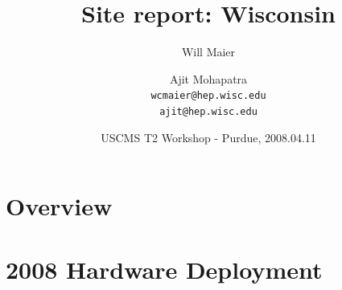 \documentclass{beamer}
\title{Site report: Wisconsin}
\author[Maier, Mohapatra]{
    Will Maier \and Ajit Mohapatra\\ 
    {\tt wcmaier@hep.wisc.edu}\\
    {\tt ajit@hep.wisc.edu}}
\institute[Wisconsin]{University of Wisconsin - High Energy Physics}
\date[2008.04.11]{USCMS T2 Workshop - Purdue, 2008.04.11}
\begin{document}
%
%
%


\begin{frame}
    \titlepage
\end{frame}

\section{Overview}
\begin{frame}
    \tableofcontents
\end{frame}

\section{2008 Hardware Deployment}
\end{document}
